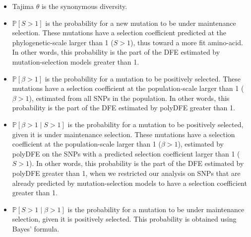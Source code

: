 \documentclass{article}
\newcommand{\Sphy}{S}
\newcommand{\given}{\mid}
\newcommand{\Spop}{\beta}
\begin{document}
    \begin{itemize}
        \item Tajima $\theta$ is the synonymous diversity.
        \item $\mathbb{P} [ \Sphy > 1 ]$ is the probability for a new mutation to be under maintenance selection.
        These mutations have a selection coefficient predicted at the phylogenetic-scale larger than 1 ($\Sphy > 1$), thus toward a more fit amino-acid.
        In other words, this probability is the part of the DFE estimated by mutation-selection models greater than 1.
        \item $\mathbb{P} [ \Spop > 1 ]$ is the probability for a mutation to be positively selected.
        These mutations have a selection coefficient at the population-scale larger than 1 ($\Spop > 1$), estimated from all SNPs in the population.
        In other words, this probability is the part of the DFE estimated by polyDFE greater than 1.
        \item $\mathbb{P} [ \Spop > 1 \given \Sphy > 1]$ is the probability for a mutation to be positively selected, given it is under maintenance selection.
        These mutations have a selection coefficient at the population-scale larger than 1 ($\Spop > 1$), estimated by polyDFE on the SNPs with a predicted selection coefficient larger than 1 ($\Sphy > 1$).
        In other words, this probability is the part of the DFE estimated by polyDFE greater than 1, when we restricted our analysis on SNPs that are already predicted by mutation-selection models to have a selection coefficient greater than 1.
        \item $\mathbb{P} [ \Sphy > 1 \given \Spop > 1]$ is the probability for a mutation to be under maintenance selection, given it is positively selected.
        This probability is obtained using Bayes' formula.
    \end{itemize}
\end{document}
